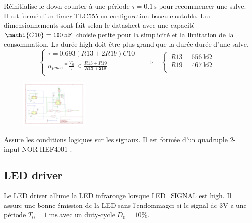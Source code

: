 \documentclass[french]{layout/Report}
\begin{document}
\begin{description}[leftmargin=!,labelwidth=3cm, labelindent=\parindent]
	\item[Burst timer] Réinitialise le down counter à une période $\tau = \SI{0.1}{\second}$ pour recommencer une salve. Il est formé d'un timer TLC555 en configuration bascule astable. Les dimensionnements sont fait selon le datasheet \cite{TLC555} avec une capacité $\mathi{C10} = \SI{100}{\nano F}$ choisie petite pour la simplicité et la limitation de la consommation. La durée high doit être plus grand que la durée durée d'une salve.
		\begin{equation*}
			\begin{cases}
				\tau = 0.693(\mathit{R13}+2\mathit{R19})\mathit{C10} \\
				n_{pulse}*\frac{T_0}{\tau} < \frac{\mathit{R13}+\mathit{R19}}{\mathit{R13}+2\mathit{19}} \\
			\end{cases}
		\quad\Rightarrow\quad
			\begin{cases}
				\mathit{R13} = \SI{556}{\kilo\ohm} \\
				\mathit{R19} = \SI{467}{\kilo\ohm} \\
			\end{cases}
		\end{equation*}

        \begin{figure}[H]
        \centering
        \includegraphics[width=0.3\textwidth]{fig/burst_timer.pdf}
        \end{figure}

	\item[Logic] Assure les conditions logiques sur les signaux. Il est formée d'un quadruple 2-input NOR HEF4001 \cite{HEF4001B}.
\end{description}

\subsection{LED driver}
\label{subsec:LED_driver}
Le LED driver allume la LED infrarouge lorsque LED\_SIGNAL est high. Il assure une bonne émission de la LED sans l'endommager si le signal de 3V a une période $T_0 = \SI{1}{\milli\second}$ avec un duty-cycle $D_0 = 10\%$.
\end{document}
